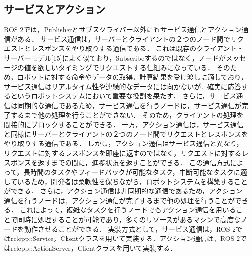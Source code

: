 \subsection{サービスとアクション}
ROS 2では，Publisherとサブスクライバー以外にもサービス通信とアクション通信がある．
サービス通信は，サーバーとクライアントの２つのノード間でリクエストとレスポンスをやり取りする通信である．
これは既存のクライアント・サーバーモデル[15]によく似ており，Subscribeするのではなく，ノードがメッセージの値を欲しいタイミングでリクエストする仕組みになっている．
そのため，ロボットに対する命令やデータの取得，計算結果を受け渡しに適しており，サービス通信はリアルタイム性や連続的なデータには向かないが，確実に応答するというロボットシステムにおいて重要な役割を果たす．
さらに，サービス通信は同期的な通信であるため，サービス通信を行うノードは，サービス通信が完了するまで他の処理を行うことができない．
そのため，クライアントの処理を間接的にブロックすることができる．
一方，アクション通信は，サービス通信と同様にサーバーとクライアントの２つのノード間でリクエストとレスポンスをやり取りする通信である．
しかし，アクション通信はサービス通信と異なり，リクエストに対するレスポンスを即座に返すのではなく，リクエストに対するレスポンスを返すまでの間に，進捗状況を返すことができる．
この通信方式によって，長時間のタスクやフィードバックが可能なタスク，中断可能なタスクに適しているため，開発者は柔軟性を保ちながら，ロボットシステムを構築することができる．
さらに，アクション通信は非同期的な通信であるため，アクション通信を行うノードは，アクション通信が完了するまで他の処理を行うことができる．
これによって，複雑なタスクを行うノードでもアクション通信を用いることで同時に処理することが可能であり，多くのリソースがあるマシンで高度なノードを動作させることができる．
実装方式として，サービス通信は，ROS 2ではrclcpp::Service，Clientクラスを用いて実装する．アクション通信は，ROS 2ではrclcpp::ActionServer，Clientクラスを用いて実装する．

